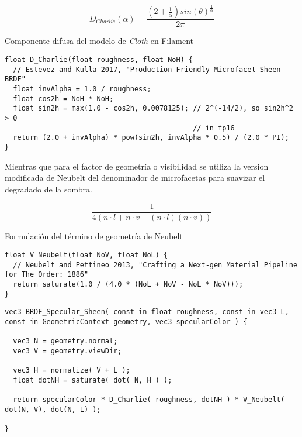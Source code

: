   \begin{eqfloat}[!htb]
    \begin{equation}
      D_{Charlie}(\alpha) = \frac
      {(2 + \frac{1}{\alpha})sin(\theta)^\frac{1}{\alpha}}
      {2\pi}
    \end{equation}
  \caption{Componente difusa del modelo de \textit{Cloth} en Filament}
  \end{eqfloat}
  \singlespacing

  \begin{lstlisting}[caption=Implementaci\'on del factor de distribuci\'on de Charlie en ThreeJs]
float D_Charlie(float roughness, float NoH) {
  // Estevez and Kulla 2017, "Production Friendly Microfacet Sheen BRDF"
  float invAlpha = 1.0 / roughness;
  float cos2h = NoH * NoH;
  float sin2h = max(1.0 - cos2h, 0.0078125); // 2^(-14/2), so sin2h^2 > 0
                                             // in fp16
  return (2.0 + invAlpha) * pow(sin2h, invAlpha * 0.5) / (2.0 * PI);
}
  \end{lstlisting}
  \singlespacing

  Mientras que para el factor de geometr\'ia o visibilidad se utiliza la version modificada de Neubelt \autocite{theorder}
  del denominador de microfacetas para suavizar el degradado de la sombra.

  \begin{eqfloat}[!htb]
    \begin{equation}
      \frac{1}{4(n\cdot{l} + n\cdot{v} - (n\cdot{l})(n\cdot{v}) )}
    \end{equation}
  \caption{Formulaci\'on del t\'ermino de geometr\'ia de Neubelt \autocite{theorder}}
  \end{eqfloat}

  \begin{lstlisting}[caption=Implementaci\'on del t\'ermino de de visibilidad de Neubelt \autocite{theorder}]
float V_Neubelt(float NoV, float NoL) {
  // Neubelt and Pettineo 2013, "Crafting a Next-gen Material Pipeline for The Order: 1886"
  return saturate(1.0 / (4.0 * (NoL + NoV - NoL * NoV)));
}
  \end{lstlisting}

  \singlespacing
  \begin{lstlisting}[caption=Cambios sobre la clase WebGLPrograms de ThreeJs]
vec3 BRDF_Specular_Sheen( const in float roughness, const in vec3 L, const in GeometricContext geometry, vec3 specularColor ) {

  vec3 N = geometry.normal;
  vec3 V = geometry.viewDir;

  vec3 H = normalize( V + L );
  float dotNH = saturate( dot( N, H ) );

  return specularColor * D_Charlie( roughness, dotNH ) * V_Neubelt( dot(N, V), dot(N, L) );

}
  \end{lstlisting}

